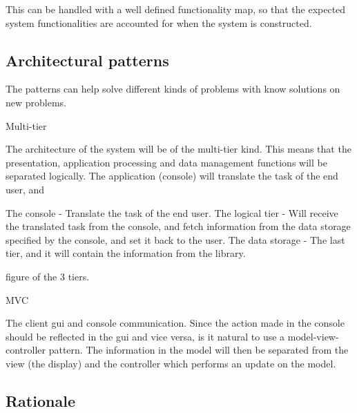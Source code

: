 This can be handled with a well defined functionality map, so that the expected system functionalities are accounted for when the system is constructed. 


\subsection{Architectural patterns}
The patterns can help solve different kinds of problems with know solutions on new problems.

Multi-tier

The architecture of the system will be of the multi-tier kind. This means that the presentation, application processing and data management functions will be separated logically. The application (console) will translate the task of the end user, and 

The console - Translate the task of the end user.
The logical tier - Will receive the translated task from the console, and fetch information from the data storage specified by the console, and set it back to the user.
The data storage - The last tier, and it will contain the information from the library.

figure of the 3 tiers. 

MVC

The client gui and console communication. Since the action made in the console should be reflected in the gui and vice versa, is it natural to use a model-view-controller pattern. The information in the model will then be separated from the view (the display) and the controller which performs an update on the model. 


\subsection{Rationale}
